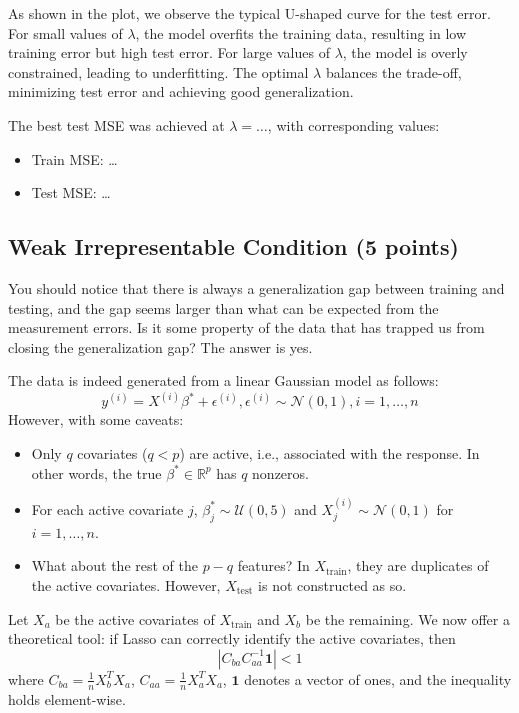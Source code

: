\documentclass{article}
\begin{document}
\begin{enumerate}[label=(\alph*)]
As shown in the plot, we observe the typical U-shaped curve for the test error. For small values of \( \lambda \), the model overfits the training data, resulting in low training error but high test error. For large values of \( \lambda \), the model is overly constrained, leading to underfitting. The optimal \( \lambda \) balances the trade-off, minimizing test error and achieving good generalization.

The best test MSE was achieved at \( \lambda = \ldots \), with corresponding values:
\begin{itemize}
    \item Train MSE: \ldots
    \item Test MSE: \ldots
\end{itemize}

\end{enumerate}

\subsection{Weak Irrepresentable Condition (5 points)}

You should notice that there is always a generalization gap between training and testing, and the gap seems
larger than what can be expected from the measurement errors. Is it some property of the data that has
trapped us from closing the generalization gap? The answer is yes.

The data is indeed generated from a linear Gaussian model as follows:
\[y^{(i)} = X^{(i)}\beta^* + \epsilon^{(i)}, \epsilon^{(i)} \sim \mathcal{N}(0, 1), i = 1, \ldots, n \tag{2}\]
However, with some caveats:
\begin{itemize}
\item Only $q$ covariates ($q < p$) are active, i.e., associated with the response. In other words, the true $\beta^* \in \mathbb{R}^p$
has $q$ nonzeros.
\item For each active covariate $j$, $\beta^*_j \sim \mathcal{U}(0, 5)$ and $X^{(i)}_j \sim \mathcal{N}(0, 1)$ for $i = 1, \ldots, n$.
\item What about the rest of the $p - q$ features? In $X_{\text{train}}$, they are duplicates of the active covariates.
However, $X_{\text{test}}$ is not constructed as so.
\end{itemize}

Let $X_a$ be the active covariates of $X_{\text{train}}$ and $X_b$ be the remaining. We now offer a theoretical tool: if
Lasso can correctly identify the active covariates, then
\[|C_{ba}C_{aa}^{-1} \mathbf{1}| < 1 \tag{3}\]
where $C_{ba} = \frac{1}{n}X_b^T X_a$, $C_{aa} = \frac{1}{n}X_a^T X_a$, $\mathbf{1}$ denotes a vector of ones, and the inequality holds element-wise.
\end{document}
